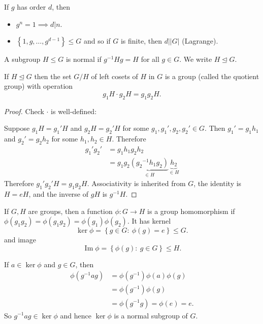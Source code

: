 \documentclass[a4paper]{scrartcl}
\begin{document}
\begin{remark}
     If $g$ has order $d$, then 
     \begin{itemize}
         \item $g^{n}=1 \implies d|n$. 
         \item $\left\{1,g, \ldots , g^{d-1}\right\}\leq G$ and so if $G$ is finite, then $d | |G|$ (Lagrange).
     \end{itemize}
\end{remark}
\begin{definition*}
     A subgroup $H \leq G$ is normal if ${g}^{-1}Hg=H$ for all $g \in G$. We write $H \unlhd G$.
\end{definition*}
\begin{proposition}
     If $H \unlhd G$ then the set $G/H$ of left cosets of $H$ in $G$ is a group (called the quotient group) with operation \[
     g_1 H \cdot g_2 H= g_1 g_2 H
     .\] 
\end{proposition}
\begin{proof}
     Check $\cdot $ is well-defined:

     Suppose $g_1 H=g_1 ' H$ and $g_2 H= g_2 ' H$ for some $g_1 , g_1 ',g_2 , g_2' \in G$. Then $g_1 ' =g_1 h_1 $ and $g_2 '=g_2 h_2 $ for some $h_1 , h_2 \in H$. Therefore 
     \begin{align*}
         g_1 ' g_2 ' &=g_1 h_1 g_2 h_2 \\
         &=g_1 g_2 \underbrace{({g_2 }^{-1}h_1 g_2 )}_{\in H} \underbrace{ h_2}_{\in H} 
     \end{align*}  
     Therefore $g_1 ' g_2 ' H=g_1 g_2 H$.
     Associativity is inherited from $G$, the identity is $H=eH$, and the inverse of $gH$ is ${g}^{-1}H$.
\end{proof}

\begin{definition*}[Homomorphism]
     If $G,H$ are groups, then a function $\phi: G \rightarrow H$ is a group homomorphism if $\phi (g_1 g_2)=\phi (g_1 g_2 )=\phi (g_1 )\phi (g_2 )$. It has kernel \[
     \operatorname{ker} \phi= \left\{g \in G: \ \phi (g)=e\right\} \leq G
     .\]  and image \[
     \operatorname{Im} \phi = \left\{\phi (g): \ g \in G \right\} \leq H
     .\] 
\end{definition*}
\begin{remark}
     If $a \in \operatorname{ker}\phi$ and $g \in G$, then 
     \begin{align*}
         \phi ({g}^{-1}ag)&=\phi ({g}^{-1}) \phi (a) \phi (g)\\
         &=\phi ({g}^{-1}) \phi (g)\\
         &= \phi ({g}^{-1}g)=\phi (e)=e.
     \end{align*}
     So ${g}^{-1}ag \in \operatorname{ker}\phi$ and hence $\operatorname{ker}\phi$ is a normal subgroup of $G$.
\end{remark}
\end{document}
